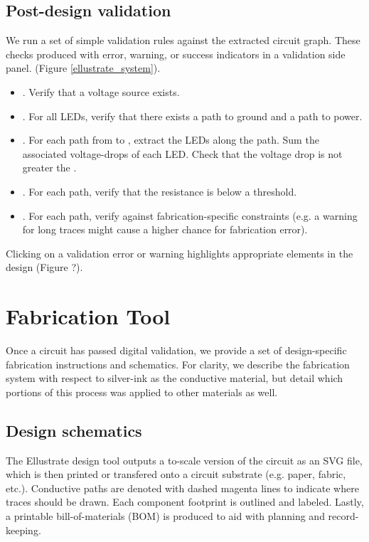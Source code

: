 \documentclass{sigchi}
\begin{document}
    \subsection{Post-design validation}
        We run a set of simple validation rules against the extracted circuit graph. These checks produced with error, warning, or success indicators in a validation side panel. (Figure \ref{ellustrate_system}). 
            \begin{itemize}
                \item {}. Verify that a voltage source exists.
                \item {}. For all LEDs, verify that there exists a path to ground and a path to power.
                \item {}. For each path from  to , extract the LEDs along the path. Sum the associated voltage-drops of each LED. Check that the voltage drop is not greater the .
                \item {}. For each path, verify that the resistance is below a threshold. 
                \item {}. For each path, verify against fabrication-specific constraints (e.g. a warning for long traces might cause a higher chance for fabrication error).
            \end{itemize}
         Clicking on a validation error or warning highlights appropriate elements in the design (Figure ?). 
    
\section{Fabrication Tool}
    Once a circuit has passed digital validation, we provide a set of design-specific fabrication instructions and schematics. For clarity, we describe the fabrication system with respect to silver-ink as the conductive material, but detail which portions of this process was applied to other materials as well. 

    \subsection{Design schematics}
        The Ellustrate design tool outputs a to-scale version of the circuit as an SVG file, which is then printed or transfered onto a circuit substrate (e.g. paper, fabric, etc.). Conductive paths are denoted with dashed magenta lines to indicate where traces should be drawn.
        Each component footprint is outlined and labeled. Lastly, a printable bill-of-materials (BOM) is produced to aid with planning and record-keeping.
\end{document}
